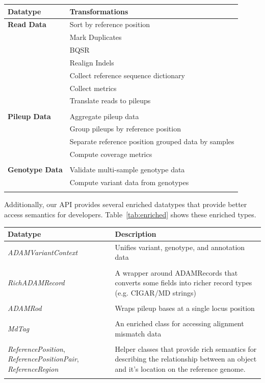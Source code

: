 \documentclass{bioinfo}
\begin{document}
\begin{table}[h]
{\begin{tabular}{ l l }
\toprule
\bf Datatype & \bf Transformations \\
\midrule
\bf Read Data & Sort by reference position \\
 & Mark Duplicates \\
 & BQSR \\
 & Realign Indels \\
 & Collect reference sequence dictionary \\
 & Collect metrics \\
 & Translate reads to pileups \\
 & \\
\bf Pileup Data & Aggregate pileup data \\
 & Group pileups by reference position \\
 & Separate reference position grouped data by samples \\
 & Compute coverage metrics \\
 & \\
\bf Genotype Data & Validate multi-sample genotype data \\
 & Compute variant data from genotypes \\
\botrule
\end{tabular}}{}
\end{table}

Additionally, our API provides several enriched datatypes that provide better access semantics for developers. Table~\ref{tab:enriched} shows these enriched types.

\begin{table}[h]
{\begin{tabular}{ p{2.5cm} p{5.5cm} }
\toprule
\bf Datatype & \bf Description \\
\midrule
\textit{ADAMVariantContext} & Unifies variant, genotype, and annotation data \\
 & \\
\textit{RichADAMRecord} & A wrapper around ADAMRecords that converts some fields into richer record types (e.g. CIGAR/MD strings) \\
 & \\
\textit{ADAMRod} & Wraps pileup bases at a single locus position \\
 & \\
\textit{MdTag} & An enriched class for accessing alignment mismatch data \\
 & \\
\textit{ReferencePosition}, \textit{ReferencePositionPair}, \textit{ReferenceRegion} & Helper classes that provide rich semantics for describing the relationship
between an object and it's location on the reference genome. \\
\botrule
\end{tabular}}{}
\end{table}
\end{document}

